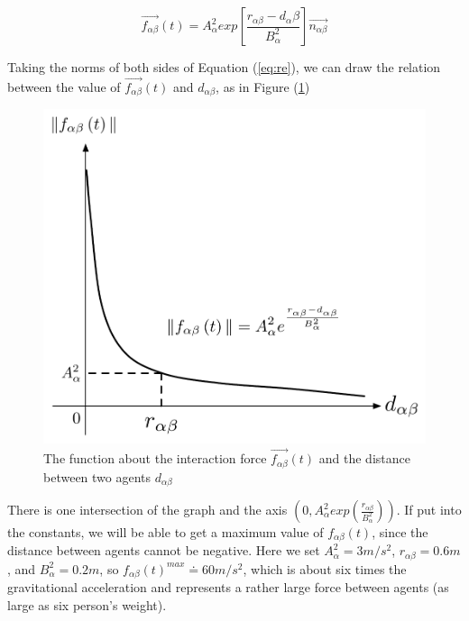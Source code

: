 \begin{equation}\label{eq:re}
\overrightarrow{f_{\alpha\beta}}(t) = A_{\alpha}^{2} exp\left[ \frac{r_{\alpha\beta} - d_{\alpha}\beta}{B_{\alpha}^{2}}\right]  \overrightarrow{n_{\alpha\beta}}
\end{equation}

Taking the norms of both sides of Equation (\ref{eq:re}), we can draw the relation 
between the value of $\overrightarrow{f_{\alpha\beta}}(t)$ and $d_{\alpha \beta}$, 
as in Figure (\ref{fig:physicalinteraction})
\\
\begin{figure}
\centering
\includegraphics[scale=0.45]{Figures/physicalinteraction.pdf} 
\caption{The function about the interaction force $\vec{f_{\alpha\beta}}(t)$ and the distance between two agents
$d_{\alpha\beta}$ }\label{fig:physicalinteraction}
\end{figure}

There is one intersection of the graph and the axis $ \left( 0, A_{\alpha}^{2} exp\left( \frac{r_{\alpha\beta} }{B_{\alpha}^{2}}\right)  \right) $. 
If put into the constants, we will be able to get a maximum value of $ f_{\alpha\beta}(t) $, 
since the distance between agents cannot be negative. Here we set $ A_{\alpha}^{2} = 3 m/s^{2} $, 
$ r_{\alpha\beta} = 0.6 m $, and $ B_{\alpha}^{2} = 0.2 m $, so $ f_{\alpha\beta}(t)^{max} \doteq 60 m/s^{2} $, 
which is about six times the gravitational acceleration and represents a rather 
large force between agents (as large as six person's weight).


